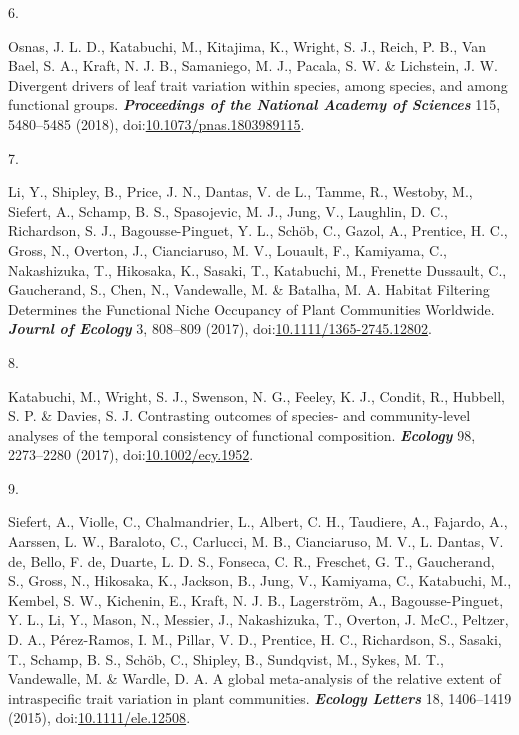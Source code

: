 \documentclass[
]{article}
\newlength{\cslhangindent}
\newlength{\csllabelwidth}
\newlength{\cslentryspacingunit} %
\newenvironment{CSLReferences}[2] %
 {%
  \setlength{\parindent}{0pt}
  \ifodd #1
  \let\oldpar\par
  \def\par{\hangindent=\cslhangindent\oldpar}
  \fi
  \setlength{\parskip}{#2\cslentryspacingunit}
 }%
 {}
\newcommand{\CSLLeftMargin}[1]{\parbox[t]{\csllabelwidth}{#1}}
\newcommand{\CSLRightInline}[1]{\parbox[t]{\linewidth - \csllabelwidth}{#1}\break}
\begin{document}
\begin{CSLReferences}{0}{0}
\leavevmode{}%
\CSLLeftMargin{6. }
\CSLRightInline{Osnas, J. L. D., Katabuchi, M., Kitajima, K., Wright, S.
J., Reich, P. B., Van Bael, S. A., Kraft, N. J. B., Samaniego, M. J.,
Pacala, S. W. \& Lichstein, J. W. Divergent drivers of leaf trait
variation within species, among species, and among functional groups.
\textbf{\emph{Proceedings of the National Academy of Sciences}} 115,
5480--5485 (2018),
doi:\href{https://doi.org/10.1073/pnas.1803989115}{10.1073/pnas.1803989115}.}

\leavevmode{}%
\CSLLeftMargin{7. }
\CSLRightInline{Li, Y., Shipley, B., Price, J. N., Dantas, V. de L.,
Tamme, R., Westoby, M., Siefert, A., Schamp, B. S., Spasojevic, M. J.,
Jung, V., Laughlin, D. C., Richardson, S. J., Bagousse-Pinguet, Y. L.,
Schöb, C., Gazol, A., Prentice, H. C., Gross, N., Overton, J.,
Cianciaruso, M. V., Louault, F., Kamiyama, C., Nakashizuka, T.,
Hikosaka, K., Sasaki, T., Katabuchi, M., Frenette Dussault, C.,
Gaucherand, S., Chen, N., Vandewalle, M. \& Batalha, M. A. {Habitat
Filtering Determines the Functional Niche Occupancy of Plant Communities
Worldwide}. \textbf{\emph{Journl of Ecology}} 3, 808--809 (2017),
doi:\href{https://doi.org/10.1111/1365-2745.12802}{10.1111/1365-2745.12802}.}

\leavevmode{}%
\CSLLeftMargin{8. }
\CSLRightInline{Katabuchi, M., Wright, S. J., Swenson, N. G., Feeley, K.
J., Condit, R., Hubbell, S. P. \& Davies, S. J. Contrasting outcomes of
species- and community-level analyses of the temporal consistency of
functional composition. \textbf{\emph{Ecology}} 98, 2273--2280 (2017),
doi:\href{https://doi.org/10.1002/ecy.1952}{10.1002/ecy.1952}.}

\leavevmode{}%
\CSLLeftMargin{9. }
\CSLRightInline{Siefert, A., Violle, C., Chalmandrier, L., Albert, C.
H., Taudiere, A., Fajardo, A., Aarssen, L. W., Baraloto, C., Carlucci,
M. B., Cianciaruso, M. V., L. Dantas, V. de, Bello, F. de, Duarte, L. D.
S., Fonseca, C. R., Freschet, G. T., Gaucherand, S., Gross, N.,
Hikosaka, K., Jackson, B., Jung, V., Kamiyama, C., Katabuchi, M.,
Kembel, S. W., Kichenin, E., Kraft, N. J. B., Lagerström, A.,
Bagousse-Pinguet, Y. L., Li, Y., Mason, N., Messier, J., Nakashizuka,
T., Overton, J. McC., Peltzer, D. A., Pérez-Ramos, I. M., Pillar, V. D.,
Prentice, H. C., Richardson, S., Sasaki, T., Schamp, B. S., Schöb, C.,
Shipley, B., Sundqvist, M., Sykes, M. T., Vandewalle, M. \& Wardle, D.
A. A global meta-analysis of the relative extent of intraspecific trait
variation in plant communities. \textbf{\emph{Ecology Letters}} 18,
1406--1419 (2015),
doi:\href{https://doi.org/10.1111/ele.12508}{10.1111/ele.12508}.}


\end{CSLReferences}
\end{document}
